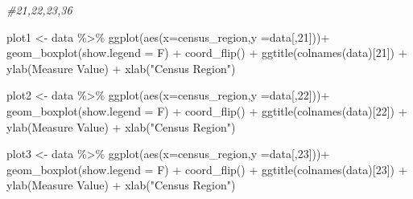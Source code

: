\documentclass[
]{article}
\newenvironment{Shaded}{\begin{snugshade}}{\end{snugshade}}
\newcommand{\AttributeTok}[1]{\textcolor[rgb]{0.77,0.63,0.00}{#1}}
\newcommand{\CommentTok}[1]{\textcolor[rgb]{0.56,0.35,0.01}{\textit{#1}}}
\newcommand{\DecValTok}[1]{\textcolor[rgb]{0.00,0.00,0.81}{#1}}
\newcommand{\FunctionTok}[1]{\textcolor[rgb]{0.00,0.00,0.00}{#1}}
\newcommand{\NormalTok}[1]{#1}
\newcommand{\OtherTok}[1]{\textcolor[rgb]{0.56,0.35,0.01}{#1}}
\newcommand{\SpecialCharTok}[1]{\textcolor[rgb]{0.00,0.00,0.00}{#1}}
\newcommand{\StringTok}[1]{\textcolor[rgb]{0.31,0.60,0.02}{#1}}
\begin{document}
\begin{Shaded}
\begin{Highlighting}[]
\CommentTok{\#21,22,23,36}

\NormalTok{plot1 }\OtherTok{\textless{}{-}}\NormalTok{ data  }\SpecialCharTok{\%\textgreater{}\%} \FunctionTok{ggplot}\NormalTok{(}\FunctionTok{aes}\NormalTok{(}\AttributeTok{x=}\NormalTok{census\_region,}\AttributeTok{y =}\NormalTok{data[,}\DecValTok{21}\NormalTok{]))}\SpecialCharTok{+}
  \FunctionTok{geom\_boxplot}\NormalTok{(}\AttributeTok{show.legend =}\NormalTok{ F) }\SpecialCharTok{+}
  \FunctionTok{coord\_flip}\NormalTok{() }\SpecialCharTok{+}
  \FunctionTok{ggtitle}\NormalTok{(}\FunctionTok{colnames}\NormalTok{(data)[}\DecValTok{21}\NormalTok{]) }\SpecialCharTok{+} 
  \FunctionTok{ylab}\NormalTok{(}\StringTok{\textquotesingle{}Measure Value\textquotesingle{}}\NormalTok{) }\SpecialCharTok{+} \FunctionTok{xlab}\NormalTok{(}\StringTok{"Census Region"}\NormalTok{)}


\NormalTok{plot2 }\OtherTok{\textless{}{-}}\NormalTok{ data }\SpecialCharTok{\%\textgreater{}\%} \FunctionTok{ggplot}\NormalTok{(}\FunctionTok{aes}\NormalTok{(}\AttributeTok{x=}\NormalTok{census\_region,}\AttributeTok{y =}\NormalTok{data[,}\DecValTok{22}\NormalTok{]))}\SpecialCharTok{+}
  \FunctionTok{geom\_boxplot}\NormalTok{(}\AttributeTok{show.legend =}\NormalTok{ F) }\SpecialCharTok{+}
  \FunctionTok{coord\_flip}\NormalTok{() }\SpecialCharTok{+}
  \FunctionTok{ggtitle}\NormalTok{(}\FunctionTok{colnames}\NormalTok{(data)[}\DecValTok{22}\NormalTok{]) }\SpecialCharTok{+} 
  \FunctionTok{ylab}\NormalTok{(}\StringTok{\textquotesingle{}Measure Value\textquotesingle{}}\NormalTok{) }\SpecialCharTok{+} \FunctionTok{xlab}\NormalTok{(}\StringTok{"Census Region"}\NormalTok{)}

\NormalTok{plot3 }\OtherTok{\textless{}{-}}\NormalTok{ data }\SpecialCharTok{\%\textgreater{}\%} \FunctionTok{ggplot}\NormalTok{(}\FunctionTok{aes}\NormalTok{(}\AttributeTok{x=}\NormalTok{census\_region,}\AttributeTok{y =}\NormalTok{data[,}\DecValTok{23}\NormalTok{]))}\SpecialCharTok{+}
  \FunctionTok{geom\_boxplot}\NormalTok{(}\AttributeTok{show.legend =}\NormalTok{ F) }\SpecialCharTok{+}
  \FunctionTok{coord\_flip}\NormalTok{() }\SpecialCharTok{+}
  \FunctionTok{ggtitle}\NormalTok{(}\FunctionTok{colnames}\NormalTok{(data)[}\DecValTok{23}\NormalTok{]) }\SpecialCharTok{+} 
  \FunctionTok{ylab}\NormalTok{(}\StringTok{\textquotesingle{}Measure Value\textquotesingle{}}\NormalTok{) }\SpecialCharTok{+} \FunctionTok{xlab}\NormalTok{(}\StringTok{"Census Region"}\NormalTok{)}



\end{Highlighting}
\end{Shaded}
\end{document}
